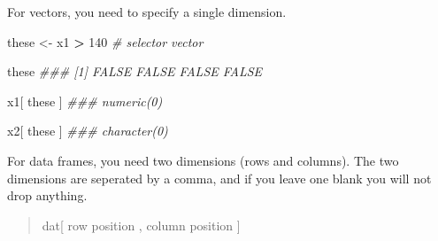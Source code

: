 \documentclass[]{book}
\newenvironment{Shaded}{\begin{snugshade}}{\end{snugshade}}
\newcommand{\CommentTok}[1]{\textcolor[rgb]{0.56,0.35,0.01}{\textit{#1}}}
\newcommand{\DecValTok}[1]{\textcolor[rgb]{0.00,0.00,0.81}{#1}}
\newcommand{\NormalTok}[1]{#1}
\newcommand{\OperatorTok}[1]{\textcolor[rgb]{0.81,0.36,0.00}{\textbf{#1}}}
\newcommand{\StringTok}[1]{\textcolor[rgb]{0.31,0.60,0.02}{#1}}
\theoremstyle{definition}
\theoremstyle{definition}
\theoremstyle{definition}
\theoremstyle{remark}
\begin{document}
For vectors, you need to specify a single dimension.

\begin{Shaded}
\begin{Highlighting}[]
\NormalTok{these <-}\StringTok{ }\NormalTok{x1 }\OperatorTok{>}\StringTok{ }\DecValTok{140}     \CommentTok{# selector vector}

\NormalTok{these}
\CommentTok{### [1] FALSE FALSE FALSE FALSE}

\NormalTok{x1[ these ]}
\CommentTok{### numeric(0)}

\NormalTok{x2[ these ]}
\CommentTok{### character(0)}
\end{Highlighting}
\end{Shaded}

For data frames, you need two dimensions (rows and columns). The two
dimensions are seperated by a comma, and if you leave one blank you will
not drop anything.

\begin{quote}
dat{[} row position , column position {]}
\end{quote}
\end{document}
